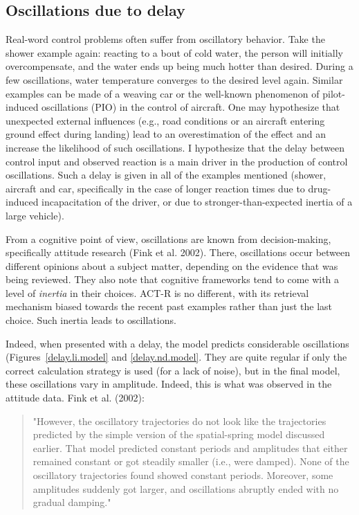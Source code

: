 \documentclass[twocolumn]{article}
\begin{document}
\subsection{Oscillations due to delay}

Real-word control problems often suffer from oscillatory behavior.  Take the shower example again: reacting to a bout of cold water, the person will initially overcompensate, and the water ends up being much hotter than desired.  During a few oscillations, water temperature converges to the desired level again.  Similar examples can be made of a weaving car or the well-known phenomenon of pilot-induced oscillations (PIO) in the control of aircraft.  One may hypothesize that unexpected external influences (e.g., road conditions or an aircraft entering ground effect during landing) lead to an overestimation of the effect and an increase the likelihood of such oscillations.  I hypothesize that the delay between control input and observed reaction is a main driver in the production of control oscillations.  Such a delay is given in all of the examples mentioned (shower, aircraft and car, specifically in the case of longer reaction times due to drug-induced incapacitation of the driver, or due to stronger-than-expected inertia of a large vehicle). 

From a cognitive point of view, oscillations are known from decision-making, specifically attitude research (Fink et al. 2002).  There, oscillations occur between different opinions about a subject matter, depending on the evidence that was being reviewed.   They also note that cognitive frameworks tend to come with a level of \emph{inertia} in their choices.  ACT-R is no different, with its retrieval mechanism biased towards the recent past examples rather than just the last choice.  Such inertia leads to oscillations.

Indeed, when presented with a delay, the model predicts considerable oscillations (Figures~\ref{delay.li.model} and \ref{delay.nd.model}.  They are quite regular if only the correct calculation strategy is used (for a lack of noise), but in the final model, these oscillations vary in amplitude.  Indeed, this is what was observed in the attitude data.  Fink et al. (2002):
\begin{quote}"However, the oscillatory trajectories do not look like the trajectories predicted by the simple version of the spatial-spring model discussed earlier.  That model predicted constant periods and amplitudes that either remained constant or got steadily smaller (i.e., were damped).  None of the oscillatory trajectories found showed constant periods.  Moreover, some amplitudes suddenly got larger, and oscillations abruptly ended with no gradual damping." \end{quote}
\end{document}
